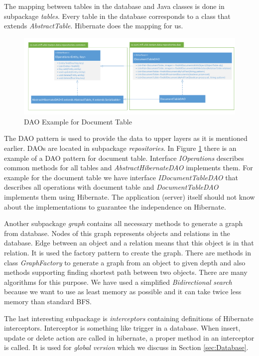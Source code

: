 The mapping between tables in the database and Java classes is done in
subpackage \emph{tables}. Every table in the database corresponds to a class
that extends \emph{AbstractTable}. Hibernate does the mapping for us.

\begin{figure}[!htb]
        \centering
        \includegraphics[width=\textwidth]{Images/DatabaseDAO}
        \caption{DAO Example for Document Table}
        \label{fig:DatabaseDAO}
\end{figure}

The DAO pattern is used to provide the data to upper layers as it is mentioned
earlier. DAOs are located in subpackage \emph{repositories}.
In Figure \ref{fig:DatabaseDAO} there is an example of a
DAO pattern for document table. Interface \emph{IOperations} describes common
methods for all tables and \emph{AbstractHibernateDAO} implements them. For
example for the document table we have interface \emph{IDocumentTableDAO} that
describes all operations with document table and \emph{DocumentTableDAO}
implements them using Hibernate. The application (server) itself should not know
about the implementations to guarantee the independence on Hibernate.

Another subpackage \emph{graph} contains all necessary methods to generate a
graph from database. Nodes of this graph represents objects and relations in
the database. Edge between an object and a relation means that this object is in
that relation. It is used the factory pattern to create the graph. There are
methods in class \emph{GraphFactory} to generate a graph from an object to given
depth and also methods supporting finding shortest path between two objects.	
There are many algorithms for this purpose. We have
used a simplified \emph{Bidirectional search} because we want to use as least memory as
possible and it can take twice less memory than standard BFS.

The last interesting subpackage is \emph{interceptors} containing definitions
of Hibernate interceptors. Interceptor is something like trigger in a database.
When insert, update or delete action are called in hibernate, a proper method
in an interceptor is called. It is used for \emph{global version} which we
discuss in Section \ref{sec:Database}.

